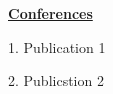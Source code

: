 \null{}
\begin{center}
{\bf \Large \underline{Conferences}}
\end{center}
\vspace{12mm}


1. Publication 1

2. Publicstion 2

